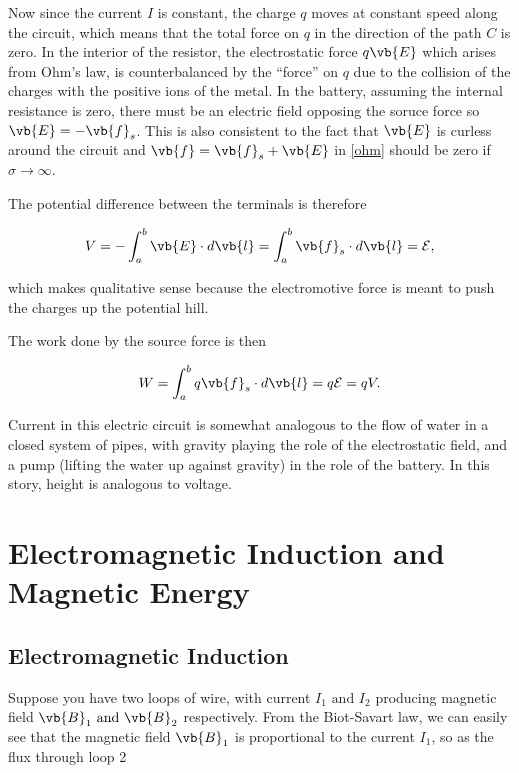 \documentclass[english,a4paper,12pt]{report}
\begin{document}
Now since the current \(I\) is constant, the charge \(q\) moves at constant speed along the circuit, which means that the total force on \(q\) in the direction of the path \(C\) is zero. In the interior of the resistor, the electrostatic force \( q\vb{E}  \) which arises from Ohm's law, is counterbalanced by the ``force'' on \(q\) due to the collision of the charges with the positive ions of the metal. In the battery, assuming the internal resistance is zero, there must be an electric field opposing the soruce force so \(\vb{E} = - \vb{f} _{s} \). This is also consistent to the fact that \(\vb{E} \) is curless around the circuit and \(\vb{f} = \vb{f} _{s} + \vb{E}  \) in \cref{ohm} should be zero if \(\sigma \rightarrow \infty\). 

The potential difference between the terminals is therefore 

\begin{equation}
    V = -\int_{a}^{b} \vb{E} \cdot d \vb{l} = \int_{a}^{b} \vb{f} _{s} \cdot d \vb{l} = \mathcal{E},
\end{equation}

which makes qualitative sense because the electromotive force is meant to push the charges up the potential hill.

The work done by the source force is then 

\begin{equation}
    W = \int_{a}^{b} q \vb{f} _{s} \cdot d \vb{l} = q \mathcal{E} = qV.
\end{equation}

Current in this electric circuit is somewhat analogous to the flow of water in a closed system of pipes, with gravity playing the role of the electrostatic field, and a pump (lifting the water up against gravity) in the role of the battery. In this story, height is analogous to voltage.

\section{Electromagnetic Induction and Magnetic Energy}

\subsection{Electromagnetic Induction}

Suppose you have two loops of wire, with current \(I_1 \text { and } I_2 \) producing magnetic field \(\vb{B} _{1} \text { and } \vb{B} _{2}\) respectively. From the Biot-Savart law, we can easily see that the magnetic field \(\vb{B} _{1} \) is proportional to the current \(I_1 \), so as the flux through loop 2 
\end{document}
